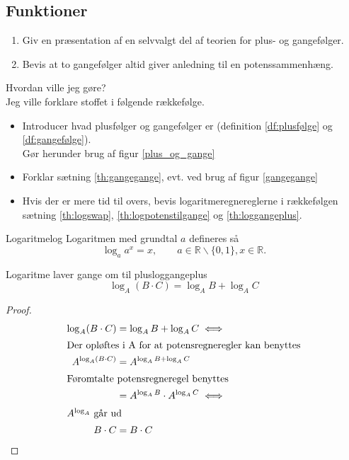 \documentclass{article}
\begin{document}
\begin{tcolorbox}
	\section{Funktioner}
	\tcblower
	\begin{enumerate}
		\item Giv en præsentation af en selvvalgt del af teorien for plus- og gangefølger.
		\item Bevis at to gangefølger altid giver anledning til en potenssammenhæng.
	\end{enumerate}
\end{tcolorbox}

\begin{eksempel*}{Hvordan ville jeg gøre?}{}\\
	Jeg ville forklare stoffet i følgende rækkefølge.
	\begin{itemize}
		\item Introducer hvad plusfølger og gangefølger er 
			(definition \ref{df:plusfølge} og \ref{df:gangefølge}).\\
			Gør herunder brug af figur \ref{plus_og_gange} %
		\item Forklar sætning \ref{th:gangegange}, evt. ved brug af figur \ref{gangegange}
		\item Hvis der er mere tid til overs, bevis logaritmeregnereglerne i rækkefølgen
			sætning \ref{th:logswap}, \ref{th:logpotenstilgange} og \ref{th:loggangeplus}.
	\end{itemize}
\end{eksempel*}

\begin{definition}{Logaritme}{log}
	Logaritmen med grundtal $a$ defineres så
	\[
		\log_a{a^x} = x,\qquad a \in \mathbb{R}\backslash\{0, 1\}, x\in\mathbb{R}.
	\] 
\end{definition}

\begin{theorem}{Logaritme laver gange om til plus}{loggangeplus}
	\[\log_A(B \cdot C) = \log_AB + \log_AC\]
\end{theorem}

\begin{proof}
\begin{align*}
	\log_A(B \cdot C) &= \log_AB + \log_AC \iff\\
\intertext{Der opløftes i A for at potensregneregler kan benyttes}
	A^{\log_A(B \cdot C)} &= A^{\log_AB + \log_AC}\\
\intertext{Føromtalte potensregneregel benyttes}
						  &= A^{\log_AB} \cdot A^{\log_AC} \iff\\
\intertext{$A^{\log_A}$ går ud}
	B \cdot C &= B \cdot C\qedhere
\end{align*}
\end{proof}
\end{document}
